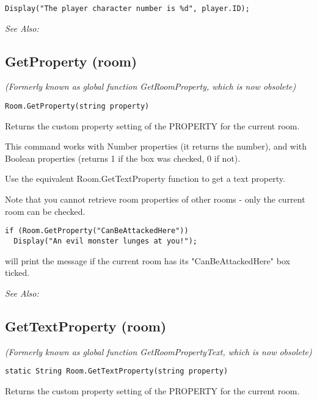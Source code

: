 \begin{verbatim}
Display("The player character number is %d", player.ID);
\end{verbatim}

\it{See Also:} 


\subsection{GetProperty (room)}\label{Room.GetProperty}%

\it{(Formerly known as global function GetRoomProperty, which is now obsolete)}

\begin{verbatim}
Room.GetProperty(string property)
\end{verbatim}
Returns the custom property setting of the PROPERTY for the current room.

This command works with Number properties (it returns the number), and with Boolean
properties (returns 1 if the box was checked, 0 if not).

Use the equivalent Room.GetTextProperty function to get a text property.

Note that you cannot retrieve room properties of other rooms - only the current room
can be checked.

\begin{verbatim}
if (Room.GetProperty("CanBeAttackedHere"))
  Display("An evil monster lunges at you!");
\end{verbatim}
will print the message if the current room has its "CanBeAttackedHere" box ticked.

\it{See Also:} 


\subsection{GetTextProperty (room)}\label{Room.GetTextProperty}%

\it{(Formerly known as global function GetRoomPropertyText, which is now obsolete)}

\begin{verbatim}
static String Room.GetTextProperty(string property)
\end{verbatim}
Returns the custom property setting of the PROPERTY for the current room.

